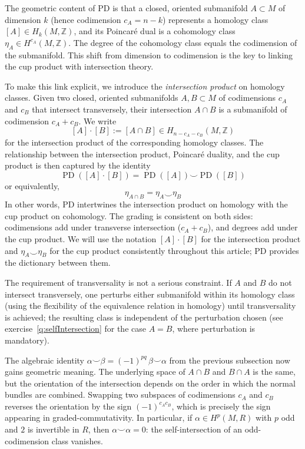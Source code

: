 \documentclass{article}
\newcommand{\Z}{{\mathbb{Z}}}
\begin{document}
The geometric content of PD is that a closed, oriented submanifold $A \subset
M$ of dimension $k$ (hence codimension $c_A = n - k$) represents a homology
class $[A] \in H_k(M, \Z)$, and its Poincar\'{e} dual is a cohomology class
$\eta_A \in H^{c_A}(M, \Z)$. The degree of the cohomology class equals the
codimension of the submanifold. This shift from dimension to codimension is
the key to linking the cup product with intersection theory.

To make this link explicit, we introduce the \emph{intersection product} on
homology classes. Given two closed, oriented submanifolds $A, B \subset M$ of
codimensions $c_A$ and $c_B$ that intersect transversely, their intersection $A
\cap B$ is a submanifold of codimension $c_A + c_B$. We write
\[
  [A] \cdot [B] := [A \cap B] \in H_{n - c_A - c_B}(M, \Z)
\]
for the intersection product of the corresponding homology classes. The
relationship between the intersection product, Poincar\'{e} duality, and the
cup product is then captured by the identity
\[
  \operatorname{PD}([A] \cdot [B])
    = \operatorname{PD}([A]) \smile \operatorname{PD}([B])
\]
or equivalently,
\[
  \eta_{A \cap B} = \eta_A \smile \eta_B
\]
In other words, PD intertwines the intersection product on homology with the
cup product on cohomology. The grading is consistent on both sides: codimensions
add under transverse intersection ($c_A + c_B$), and degrees add under the cup
product. We will use the notation $[A] \cdot [B]$ for the intersection product
and $\eta_A \smile \eta_B$ for the cup product consistently throughout this
article; PD provides the dictionary between them.

The requirement of transversality is not a serious constraint. If $A$ and $B$
do not intersect transversely, one perturbs either submanifold within its
homology class (using the flexibility of the equivalence relation in homology)
until transversality is achieved; the resulting class is independent of the
perturbation chosen (see exercise~\ref{q:selfIntersection} for the case
$A = B$, where perturbation is mandatory).

The algebraic identity $\alpha \smile \beta = (-1)^{pq}\,\beta \smile \alpha$
from the previous subsection now gains geometric meaning. The underlying space
of $A \cap B$ and $B \cap A$ is the same, but the orientation of the
intersection depends on the order in which the normal bundles are combined.
Swapping two subspaces of codimensions $c_A$ and $c_B$ reverses the orientation
by the sign $(-1)^{c_A c_B}$, which is precisely the sign appearing in
graded-commutativity. In particular, if $\alpha \in H^p(M, R)$ with $p$ odd and
$2$ is invertible in $R$, then $\alpha \smile \alpha = 0$: the self-intersection
of an odd-codimension class vanishes.
\end{document}
